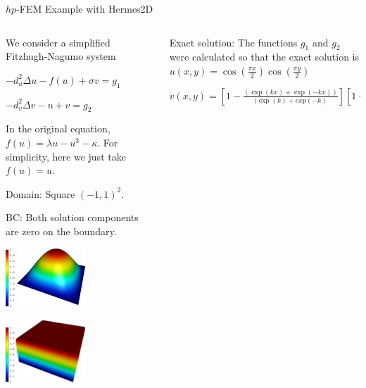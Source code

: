 \begin{frame}{$hp$-FEM}
  {Example with Hermes2D}
  \tiny
  \begin{columns}
  \begin{column}{5cm}
    We consider a simplified Fitzhugh-Nagumo system
      
    $ -d_u^2 \Delta u - f(u) + \sigma v = g_1 $

    $ -d_v^2 \Delta v - u + v = g_2 $
    
    \vspace{.3cm}

    In the original equation, $ f(u) = \lambda u - u^3 - \kappa $.  For simplicity, here we just take $ f(u) = u $.

    Domain: Square $ (-1,1)^2 $.
    
    BC: Both solution components are zero on the boundary.
 

    \hspace{0.5cm} \includegraphics[width=3cm]{figures/solution_u}
    
    \hspace{1.5cm} \includegraphics[width=3cm]{figures/solution_v}

  \end{column}
  \begin{column}{7cm}
     
    Exact solution: The functions $g_1$ and $g_2$ were calculated so that the exact solution is
    $ u(x,y) = \cos(\frac{\pi x}{2}) \cos(\frac{\pi y}{2}) $
    
    $ v(x,y) = \left[1 - \frac{(\exp(k x)+\exp(-k x))}{(\exp(k) + exp(-k)}\right] \left[1 - \frac{(\exp(k y)+\exp(-k y))}{(\exp(k) + exp(-k)}\right] $
  
    \vspace{.3cm}
  

\end{column}
\end{columns}
\end{frame}
